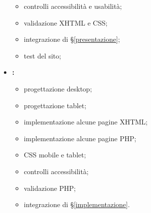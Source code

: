 \begin{itemize}
\begin{itemize}
			\item controlli accessibilità e usabilità;
			\item validazione XHTML e CSS;
			\item integrazione di §\ref{presentazione};
			\item test del sito;
		\end{itemize}
	\item \textbf{\toffo:}
		\begin{itemize}
			\item progettazione desktop;
			\item progettazione tablet;
			\item implementazione alcune pagine XHTML;
			\item implementazione alcune pagine PHP;
			\item CSS mobile e tablet;
			\item controlli accessibilità;
			\item validazione PHP;
			\item integrazione di §\ref{implementazione}.
		\end{itemize}
\end{itemize}